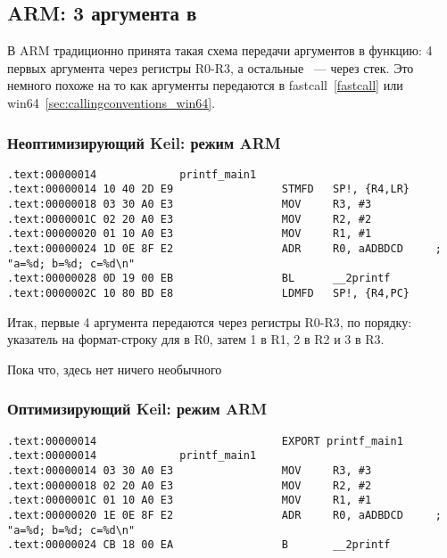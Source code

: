 ﻿%
\subsection{ARM: 3 аргумента в \printf}

В ARM традиционно принята такая схема передачи аргументов в функцию: 4 первых аргумента через регистры R0-R3,
а остальные ~--- через стек. Это немного похоже на то как аргументы передаются в fastcall~\ref{fastcall} или 
win64~\ref{sec:callingconventions_win64}.

\subsubsection{Неоптимизирующий Keil: режим ARM}

\begin{lstlisting}
.text:00000014             printf_main1
.text:00000014 10 40 2D E9                 STMFD   SP!, {R4,LR}
.text:00000018 03 30 A0 E3                 MOV     R3, #3
.text:0000001C 02 20 A0 E3                 MOV     R2, #2
.text:00000020 01 10 A0 E3                 MOV     R1, #1
.text:00000024 1D 0E 8F E2                 ADR     R0, aADBDCD     ; "a=%d; b=%d; c=%d\n"
.text:00000028 0D 19 00 EB                 BL      __2printf
.text:0000002C 10 80 BD E8                 LDMFD   SP!, {R4,PC}
\end{lstlisting}

Итак, первые 4 аргумента передаются через регистры R0-R3, по порядку: указатель на формат-строку для \printf
в R0, затем 1 в R1, 2 в R2 и 3 в R3. 

Пока что, здесь нет ничего необычного

\subsubsection{Оптимизирующий Keil: режим ARM}
\label{ARM_B_to_printf}

\begin{lstlisting}
.text:00000014                             EXPORT printf_main1
.text:00000014             printf_main1
.text:00000014 03 30 A0 E3                 MOV     R3, #3
.text:00000018 02 20 A0 E3                 MOV     R2, #2
.text:0000001C 01 10 A0 E3                 MOV     R1, #1
.text:00000020 1E 0E 8F E2                 ADR     R0, aADBDCD     ; "a=%d; b=%d; c=%d\n"
.text:00000024 CB 18 00 EA                 B       __2printf
\end{lstlisting}

